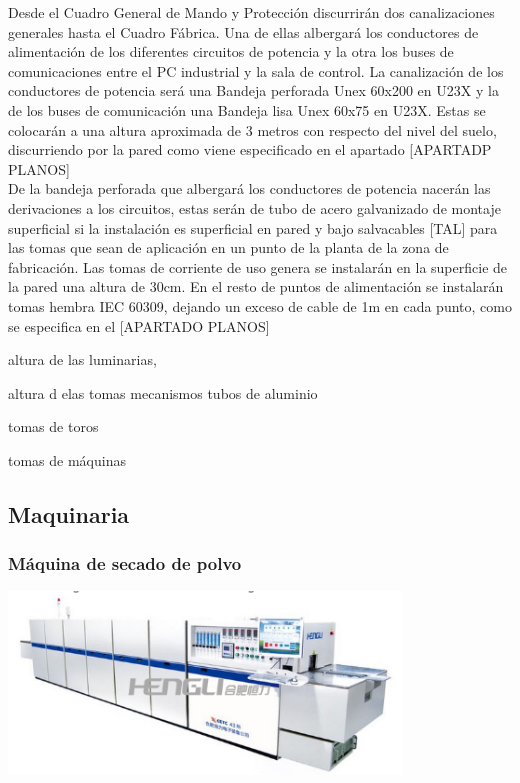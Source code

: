 Desde el Cuadro General de Mando y Protección discurrirán dos canalizaciones generales hasta el Cuadro Fábrica. Una de ellas albergará los conductores de alimentación de los diferentes circuitos de potencia y la otra los buses de comunicaciones entre el PC industrial y la sala de control. La canalización de los conductores de potencia será una Bandeja perforada Unex 60x200 en U23X y la de los buses de comunicación una Bandeja lisa Unex 60x75 en U23X. Estas se colocarán a una altura aproximada de 3 metros con respecto del nivel del suelo, discurriendo por la pared como viene especificado en el apartado [APARTADP PLANOS]\\

De la bandeja perforada que albergará los conductores de potencia nacerán las derivaciones a los circuitos, estas serán de tubo de acero galvanizado de montaje superficial si la instalación es superficial en pared y bajo salvacables [TAL] para las tomas que sean de aplicación en un punto de la planta de la zona de fabricación. Las tomas de corriente de uso genera se instalarán en la superficie de la pared una altura de 30cm. En el resto de puntos de alimentación se instalarán tomas hembra IEC 60309, dejando un exceso de cable de 1m en cada punto, como se especifica en el [APARTADO PLANOS]



altura de las luminarias,

altura d elas tomas mecanismos tubos de aluminio

tomas de toros

tomas de máquinas




\newpage

\subsection{Maquinaria}
	\subsubsection{Máquina de secado de polvo}

	\includegraphics[scale=1]{Datasheets/1HornoFoto.png}\\

